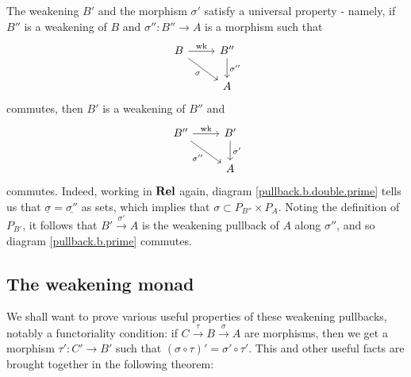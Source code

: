 \documentclass[11pt]{article} %
\theoremstyle{plain} %
\theoremstyle{definition} %
\theoremstyle{exercisestyle}
\newcommand{\catname}[1]{{\normalfont\textbf{#1}}}
\newcommand{\Rel}{\catname{Rel}}
\newcommand{\map}[3]{#2\xrightarrow{#1} #3}
\newcommand*\from{\colon}
\newcommand{\cmap}[3]{#1\from{}#2\to{}#3}
\newcommand{\comp}[2]{#1 \circ #2}
\DeclareMathOperator{\wk}{wk}
\newcommand{\grel}[1]{\underline{#1}}
\begin{document}
The weakening $B'$ and the morphism $\sigma'$ satisfy a universal property - namely, if $B''$ is a weakening of $B$ and $\cmap{\sigma''}{B''}{A}$ is a morphism such that
\begin{equation}
  \label{pullback.b.double.prime}
  \begin{tikzcd}
    B \arrow[r, "\wk"] \arrow[dr, "\sigma"']
      & B'' \arrow[d, "\sigma''"] \\
      & A
  \end{tikzcd}
\end{equation}
commutes, then $B'$ is a weakening of $B''$ and 
\begin{equation}
  \label{pullback.b.prime}
  \begin{tikzcd}
    B'' \arrow[r, "\wk"] \arrow[dr, "\sigma''"']
      & B' \arrow[d, "\sigma'"] \\
      & A
  \end{tikzcd}
\end{equation}
commutes.  Indeed, working in $\Rel$ again, diagram \eqref{pullback.b.double.prime} tells us that $\grel\sigma=\grel{\sigma''}$ as sets, which implies that $\sigma\subset P_{B''}\times P_A$.  Noting the definition of $P_{B'}$, it follows that $\map{\sigma'}{B'}{A}$ is the weakening pullback of $A$ along $\sigma''$, and so diagram \eqref{pullback.b.prime} commutes.

\subsection{The weakening monad}

We shall want to prove various useful properties of these weakening pullbacks, notably a functoriality condition: if $C\xrightarrow{\tau}\map{\sigma}{B}{A}$ are morphisms, then we get a morphism $\cmap{\tau'}{C'}{B'}$ such that $(\comp\sigma\tau)'=\comp{\sigma'}{\tau'}$.  This and other useful facts are brought together in the following theorem:
\end{document}

